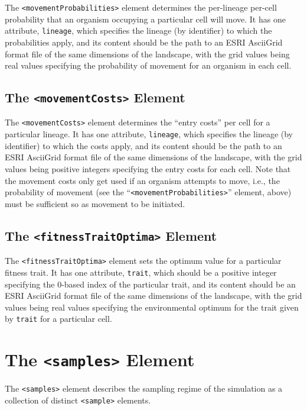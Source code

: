 \documentclass[11pt]{article}
\newcommand{\xmlelem}[1]{{\tt<\textcolor{xmlelem}{#1}>}}
\newcommand{\xmlattr}[1]{{\tt\textcolor{xmlattr}{#1}}}
\begin{document}
The \xmlelem{movementProbabilities} element determines the per-lineage per-cell probability that an organism occupying a particular cell will move. It has one attribute, \xmlattr{lineage}, which specifies the lineage (by identifier) to which the probabilities apply, and its content should be the path to an ESRI AsciiGrid format file of the same dimensions of the landscape, with the grid values being real values specifying the probability of movement for an organism in each cell.

\subsection{The \xmlelem{movementCosts} Element}

The \xmlelem{movementCosts} element determines the ``entry costs'' per cell for a particular lineage. It has one attribute, \xmlattr{lineage}, which specifies the lineage (by identifier) to which the costs apply, and its content should be the path to an ESRI AsciiGrid format file of the same dimensions of the landscape, with the grid values being positive integers specifying the entry costs for each cell. Note that the movement costs only get used if an organism attempts to move, i.e., the probability of movement (see the ``\xmlelem{movementProbabilities}'' element, above) must be sufficient so as movement to be initiated.


\subsection{The \xmlelem{fitnessTraitOptima} Element}

The \xmlelem{fitnessTraitOptima} element sets the optimum value for a particular fitness trait. It has one attribute, \xmlattr{trait}, which should be a positive integer specifying the 0-based index of the particular trait, and its content should be an ESRI AsciiGrid format file of the same dimensions of the landscape, with the grid values being real values specifying the environmental optimum for the trait given by \xmlattr{trait} for a particular cell.

\section{The \xmlelem{samples} Element}

The \xmlelem{samples} element describes the sampling regime of the simulation as a collection of distinct \xmlelem{sample} elements.
\end{document}
